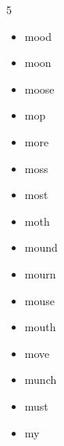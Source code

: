 \documentclass{article}
\begin{document}
\begin{multicols}{5}
\begin{itemize}
        \item mood
        \item moon
        \item moose
        \item mop
        \item more
        \item moss
        \item most
        \item moth
        \item mound
        \item mourn
        \item mouse
        \item mouth
        \item move
        \item munch
        \item must
        \item my
    \end{itemize}
\end{multicols}
\end{document}
